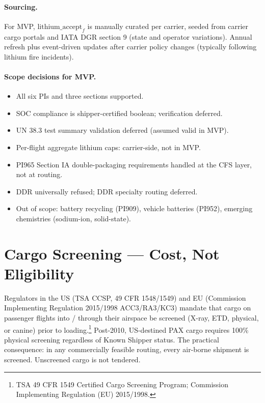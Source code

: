 \documentclass[11pt,a4paper]{article}
\theoremstyle{definition}
\begin{document}
\paragraph{Sourcing.}
For MVP, $\text{lithium\_accept}_f$ is manually curated per carrier, seeded
from carrier cargo portals and IATA DGR section 9 (state and operator
variations). Annual refresh plus event-driven updates after carrier policy
changes (typically following lithium fire incidents).

\paragraph{Scope decisions for MVP.}
\begin{itemize}[noitemsep]
  \item All six PIs and three sections supported.
  \item SOC compliance is shipper-certified boolean; verification deferred.
  \item UN 38.3 test summary validation deferred (assumed valid in MVP).
  \item Per-flight aggregate lithium caps: carrier-side, not in MVP.
  \item PI965 Section IA double-packaging requirements handled at the CFS
        layer, not at routing.
  \item DDR universally refused; DDR specialty routing deferred.
  \item Out of scope: battery recycling (PI909), vehicle batteries (PI952),
        emerging chemistries (sodium-ion, solid-state).
\end{itemize}

\section{Cargo Screening --- Cost, Not Eligibility}
\label{sec:screening}

Regulators in the US (TSA CCSP, 49 CFR 1548/1549) and EU (Commission
Implementing Regulation 2015/1998 ACC3/RA3/KC3) mandate that cargo on
passenger flights into / through their airspace be screened (X-ray, ETD,
physical, or canine) prior to loading.\footnote{TSA 49 CFR 1549 Certified
Cargo Screening Program; Commission Implementing Regulation (EU) 2015/1998.}
Post-2010, US-destined PAX cargo requires 100\% physical screening regardless
of Known Shipper status. The practical consequence: in any commercially
feasible routing, every air-borne shipment is screened. Unscreened cargo is
not tendered.
\end{document}
